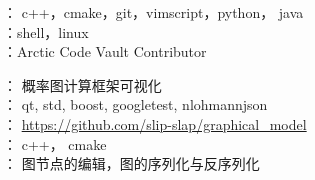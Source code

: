 

： c++，cmake，git，vimscript，python， java \\
：shell，linux\\
：Arctic Code Vault Contributor \\



： 概率图计算框架可视化 \\
： qt, std, boost, googletest, nlohmannjson \\
： \url{https://github.com/slip-slap/graphical_model} \\
： c++， cmake \\
： 图节点的编辑，图的序列化与反序列化 \\








